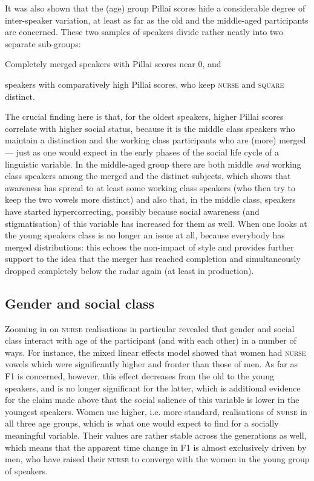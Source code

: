 It was also shown that the (age) group Pillai scores hide a considerable degree of inter-speaker variation, at least as far as the old and the middle-aged participants are concerned.
These two samples of speakers divide rather neatly into two separate sub-groups:
\begin{inparaenum}[(1)]
	\item Completely merged speakers with Pillai scores near 0, and
	\item speakers with comparatively high Pillai scores, who keep \textsc{nurse} and \textsc{square} distinct.
\end{inparaenum}
The crucial finding here is that, for the oldest speakers, higher Pillai scores correlate with higher social status, because it is the middle class speakers who maintain a distinction and the working class participants who are (more) merged --- just as one would expect in the early phases of the social life cycle of a linguistic variable.
In the middle-aged group there are both middle \emph{and} working class speakers among the merged and the distinct subjects, which shows that awareness has spread to at least some working class speakers (who then try to keep the two vowels more distinct) and also that, in the middle class, speakers have started hypercorrecting, possibly because social awareness (and stigmatisation) of this variable has increased for them as well.
When one looks at the young speakers class is no longer an issue at all, because everybody has merged distributions: this echoes the non-impact of style and provides further support to the idea that the merger has reached completion and simultaneously dropped completely below the radar again (at least in production).

\subsection{Gender and social class}
\label{prod.disc.nurse.social}

Zooming in on \textsc{nurse} realisations in particular revealed that gender and social class interact with age of the participant (and with each other) in a number of ways.
For instance, the mixed linear effects model showed that women had \textsc{nurse} vowels which were significantly higher and fronter than those of men.
As far as F1 is concerned, however, this effect decreases from the old to the young speakers, and is no longer significant for the latter, which is additional evidence for the claim made above that the social salience of this variable is lower in the youngest speakers.
Women use higher, i.e. more standard, realisations of \textsc{nurse} in all three age groups, which is what one would expect to find for a socially meaningful variable.
Their values are rather stable across the generations as well, which means that the apparent time change in F1 is almost exclusively driven by men, who have raised their \textsc{nurse} to converge with the women in the young group of speakers.

